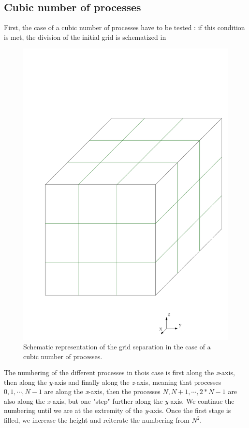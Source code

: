 \documentclass[12 pt]{article}
\begin{document}
\subsection{Cubic number of processes}
First, the case of a cubic number of processes have to be tested : if this condition is met, the division of the initial grid is schematized in 
%
\begin{figure}
	\centering
	\includegraphics[scale=0.5]{MPI_cubic_division}
	\caption{Schematic representation of the grid separation in the case of a cubic number of processes.}
	\label{fig:CUBICSEPARATION}
\end{figure}
%
The numbering of the different processes in thois case is first along the \textit{x}-axis, then along the \textit{y}-axis and finally along the \textit{z}-axis, meaning that processes $0,1,\cdots,N-1$ are along the \textit{x}-axis, then the processes $N, N+1,\cdots,2*N-1$ are also along the \textit{x}-axis, but one "step" further along the \textit{y}-axis. We continue the numbering until we are at the extremity of the \textit{y}-axis. Once the first stage is filled, we increase the height and reiterate the numbering from $N^2$.
\end{document}
